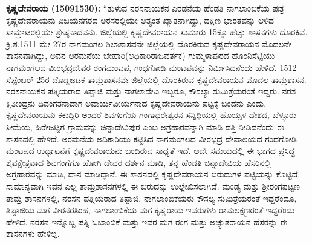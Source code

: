 \textbf{ ಕೃಷ್ಣದೇವರಾಯ (1509\general{\enginline{-}}1530):} “ತುಳುವ ನರಸನಾಯಕನ ಎರಡನೆಯ ಹೆಂಡತಿ ನಾಗಲಾಂಬಿಕೆಯ ಪುತ್ರ ಕೃಷ್ಣದೇವರಾಯನು ವಿಜಯನಗರದ ಅರಸರಲ್ಲಿಯೇ ಅತ್ಯಂತ ಖ್ಯಾತನಾಗಿದ್ದು, ದಕ್ಷಿಣ ಭಾರತವನ್ನು ಆಳಿದ ಸಾಮ್ರಾಟರಲ್ಲಿಯೇ ಶ್ರೇಷ್ಠನಾದವನು. ಜಿಲ್ಲೆಯಲ್ಲಿ ಕೃಷ್ಣದೇವರಾಯನ ಸುಮಾರು 15ಕ್ಕೂ ಹೆಚ್ಚು ಶಾಸನಗಳು ದೊರಕಿವೆ. ಕ್ರಿ.ಶ.1511 ಮೇ 27ರ ನಾಗಮಂಗಲ ಶಿಲಾಶಾಸವನೇ ಜಿಲ್ಲೆಯಲ್ಲಿ ದೊರಕಿರುವ ಕೃಷ್ಣದೇವರಾಯನ ಮೊದಲನೇ ಶಾಸನವಾಗಿದ್ದು, ಅವನ ಅರಮನೆಯ ಬೇಹಾರಿ(ಅಧಿಕಾರಿ\enginline{-}ರಾಜವರ್ತಕ) ಗುಮ್ಮಳಾಪುರದ ಹೊಂನಿಸೆಟ್ಟಿಯು ನಾಗಮಂಗಲದ ವೀರಭದ್ರದೇವರ ರಂಗಮಂಟಪ, ಗಂಧಗೋಡಿ ಮಂಟಪವನ್ನು ನಿರ್ಮಿಸಿದನೆಂದು ಹೇಳಿದೆ. 1512 ಸೆಪ್ಟೆಂಬರ್​ 25ರ ದೊಡ್ಡಜಟಕ ತಾಮ್ರಶಾಸನವೇ ಜಿಲ್ಲೆಯಲ್ಲಿ ದೊರಕಿರುವ ಕೃಷ್ಣದೇವರಾಯನ ಮೊದಲ ತಾಮ್ರಶಾಸನ. ನರಸನಾಯಕನ ಪತ್ನಿಯರಾದ ತಿಪ್ಪಾಜಿ ಮತ್ತು ನಾಗಲಾದೇವಿ ಇಬ್ಬರೂ, ಕೌಸಲ್ಯಾ ಸುಮಿತ್ರೆಯರಂತೆ ಇದ್ದರು. ನರಸ ಕ್ಷಿತೀಂದ್ರನು ದಿವಂಗತನಾದಾಗ ಅವಾರ್ಯವೀರ್ಯನಾದ ಕೃಷ್ಣದೇವರಾಯನು ಪಟ್ಟಕ್ಕೆ ಬಂದನು ಎಂದು, ಕೃಷ್ಣದೇವರಾಯನು ಕಕುದ್ಗಿರಿ ಅಂದರೆ ಶಿವಗಂಗೆಯ ಗಂಗಾಧರೇಶ್ವರನ ಸನ್ನಿಧಿಯಲ್ಲಿ ಹೊಯ್ಸಳ ದೇಶದ, ಬೆಳ್ಳೂರು ಸೀಮೆಯ, ಹಿರೇಜಟ್ಟಿಗ ಗ್ರಾಮವನ್ನು ಚಿನ್ನಾದೇವಿಪುರ ಎಂಬ ಅಗ್ರಹಾರವನ್ನಾಗಿ ಮಾಡಿ ದತ್ತಿ ನೀಡಿದನೆಂದು ಈ ಶಾಸನದಲ್ಲಿ ಹೇಳಿದೆ. ಅರಮನೆಯ ಅಧಿಕಾರಿಯು ಕಟ್ಟಿಸಿದ ನಾಗಮಂಗಲದ ವೀರಭದ್ರ ದೇವಾಲಯದ ಗಂಧಗೋಡಿ ಮಂಟಪದ ಉದ್ಘಾಟನೆಗೆ ಕೃಷ್ಣದೇವರಾಯನು ಬಂದಿರುವ ಸಾಧ್ಯತೆ ಇದೆ. ಅದೇ ಸಮಯದಲ್ಲಿ ಈ ಭಾಗದ ಪ್ರಸಿದ್ಧ ಶೈವಕ್ಷೇತ್ರವಾದ ಶಿವಗಂಗೆಗೂ ಹೋಗಿ ದೇವರ ದರ್ಶನ ಮಾಡಿ, ತನ್ನ ಹೆಂಡತಿ ಚಿನ್ನಾದೇವಿಯ ಹೆಸರಿನಲ್ಲಿ ಅಗ್ರಹಾರವನ್ನು ಮಾಡಿ, ದಾನ ಮಾಡಿದ್ದಾನೆ. ಈ ಶಾಸನದಲ್ಲಿ ಕೃಷ್ಣದೇವರಾಯನ ಬಿರುದುಗಳ ಪಟ್ಟಿಯನ್ನು ಕೊಟ್ಟಿದೆ. ಸಾಮಾನ್ಯವಾಗಿ ಇವನ ಎಲ್ಲ ತಾಮ್ರಶಾಸನಗಳಲ್ಲಿ ಈ ಬಿರುದನ್ನು ಉಲ್ಲೇಖಿಸಲಾಗಿದೆ. ಮಂಡ್ಯ ಮತ್ತು ಶ‍್ರೀರಂಗಪಟ್ಟಣ ತಾಮ್ರ ಶಾಸನಗಳಲ್ಲಿ, ನರಸನ ಪತ್ನಿಯರಾದ ತಿಪ್ಪಾಜಿ, ನಾಗಲಾಂಬಿಕೆಯರು ಕೌಸಲ್ಯ ಸುಮಿತ್ರೆಯರಂತೆ ಇದ್ದರೆಂದೂ, ತಿಪ್ಪಾಜಿಯ ಮಗ ವೀರನರಸಿಂಹ, ನಾಗಲಾಂಬಿಕೆಯ ಮಗ ಕೃಷ್ಣರಾಯ ಇವರುಗಳು ರಾಮಲಕ್ಷ್ಮಣರಂತೆ ಇದ್ದರೆಂದು ಹೇಳಿದೆ. ನರಸನ ಇನ್ನೊಬ್ಬ ಪತ್ನಿ ಓಬಾಂಬಿಕೆ ಮತ್ತು ಇವರ ಮಗ ರಂಗ ಮತ್ತು ಅಚ್ಯುತರಾಯನ ಹೆಸರನ್ನು ಈ ಶಾಸನಗಳು ಹೇಳಿಲ್ಲ.

\newpage


